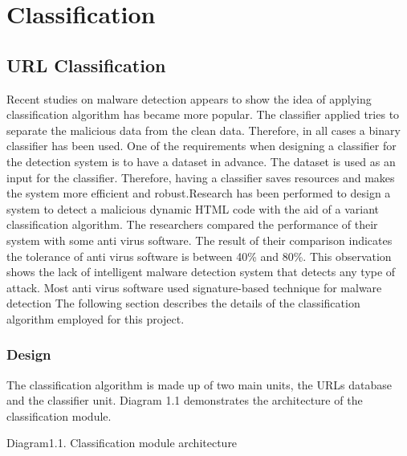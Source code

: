 \section{Classification}

\subsection{URL Classification}

Recent studies on malware detection appears to show the idea of applying classification algorithm has became more popular. The classifier applied tries to separate the malicious data from the clean data. Therefore, in all cases a binary classifier has been used. One of the requirements when designing a classifier for the detection system is to have a dataset in advance. The dataset is used as an input for the classifier. Therefore, having a classifier saves resources and makes the system more efficient and robust.Research has been performed to design a system to detect a malicious dynamic HTML code with the aid of a variant classification algorithm. The researchers compared the performance of their system with some anti virus software. The result of their comparison indicates the tolerance of anti virus software is between 40\% and 80\%. This observation shows the lack of intelligent malware detection system that detects any type of attack. Most anti virus software used signature-based technique for malware detection\cite{Macilious-weblearning}  
 The following section describes the details of the classification algorithm employed for this project. 
\subsubsection{Design}
The classification algorithm is made up of two main units, the URLs database and the classifier unit. Diagram 1.1 demonstrates the architecture of the classification module.



Diagram1.1. Classification module architecture

